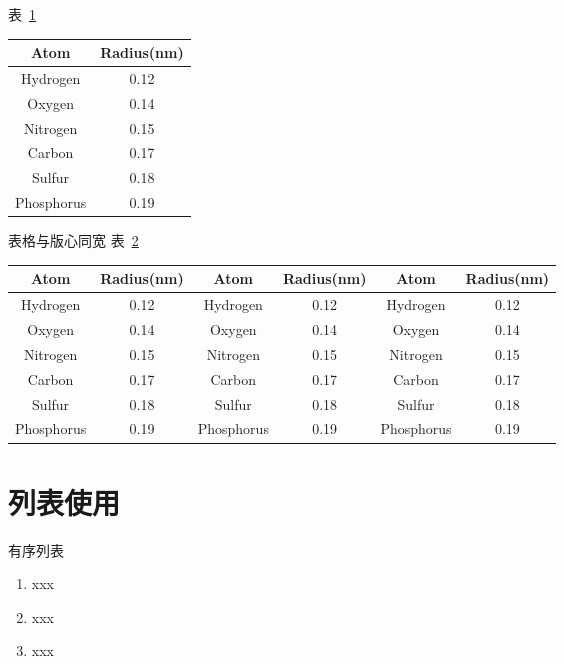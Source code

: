 \documentclass[openright,twoside]{UJS-PhD-thesis}
\begin{document}
表~\ref{tab1}

\begin{table}[h!t]
\centering
{}
\label{tab1}
\begin{tabular}{cc}
\toprule
Atom       & Radius(nm) \\
\midrule
Hydrogen   & 0.12       \\
Oxygen     & 0.14       \\
Nitrogen   & 0.15       \\
Carbon     & 0.17       \\
Sulfur     & 0.18       \\
Phosphorus & 0.19       \\
\bottomrule
\end{tabular}
\end{table}

表格与版心同宽 表~\ref{tab2}

\begin{table}[h!t]
\centering
{}
\label{tab2}
\begin{tabular*}{\linewidth}{@{\extracolsep{\fill}}cccccc}
\toprule
Atom       & Radius(nm) & Atom       & Radius(nm) & Atom       & Radius(nm) \\
\midrule
Hydrogen   & 0.12       & Hydrogen   & 0.12       & Hydrogen   & 0.12       \\
Oxygen     & 0.14       & Oxygen     & 0.14       & Oxygen     & 0.14       \\
Nitrogen   & 0.15       & Nitrogen   & 0.15       & Nitrogen   & 0.15       \\
Carbon     & 0.17       & Carbon     & 0.17       & Carbon     & 0.17       \\
Sulfur     & 0.18       & Sulfur     & 0.18       & Sulfur     & 0.18       \\
Phosphorus & 0.19       & Phosphorus & 0.19       & Phosphorus & 0.19       \\
\bottomrule
\end{tabular*}
\end{table}

\section{列表使用}

有序列表

\begin{enumerate}
\item xxx 
\item xxx 
\item xxx 
\end{enumerate}
\end{document}

